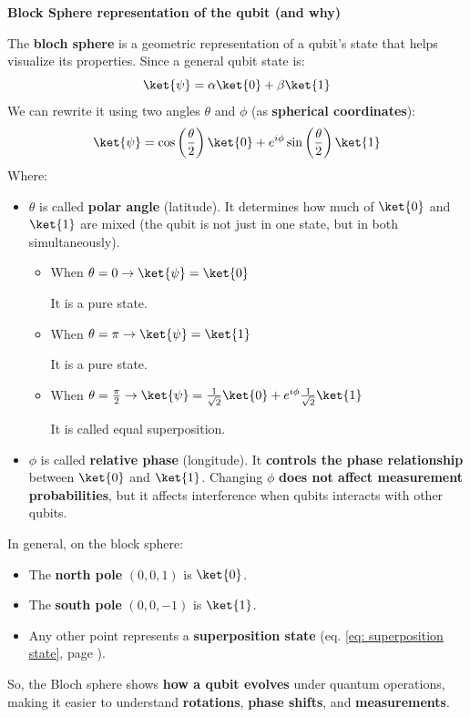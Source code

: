 \begin{flushleft}
    \textcolor{Green3}{ \textbf{Block Sphere representation of the qubit (and why)}}
\end{flushleft}
The \textbf{bloch sphere} is a geometric representation of a qubit's state that helps visualize its properties. Since a general qubit state is:
\begin{equation*}
    \ket{\psi} = \alpha\ket{0} + \beta\ket{1}
\end{equation*}
We can rewrite it using two angles $\theta$ and $\phi$ (as \textbf{spherical coordinates}):
\begin{equation}\label{eq: superposition state}
    \ket{\psi} = \cos\left(\dfrac{\theta}{2}\right) \ket{0} + e^{i\phi} \sin\left(\dfrac{\theta}{2}\right) \ket{1}
\end{equation}
Where:
\begin{itemize}
    \item $\theta$ is called \textbf{polar angle} (latitude). It determines how much of $\ket{0}$ and $\ket{1}$ are mixed (the qubit is not just in one state, but in both simultaneously).
    \begin{itemize}
        \item When $\theta = 0 \rightarrow \ket{\psi} = \ket{0}$

        It is a pure state.
        \item When $\theta = \pi \rightarrow \ket{\psi} = \ket{1}$

        It is a pure state.
        \item When $\theta = \frac{\pi}{2} \rightarrow \ket{\psi} = \frac{1}
        {\sqrt{2}}\ket{0} + e^{i\phi} \frac{1}{\sqrt{2}}\ket{1}$

        It is called equal superposition.
    \end{itemize}
    \item $\phi$ is called \textbf{relative phase} (longitude). It \textbf{controls the phase relationship} between $\ket{0}$ and $\ket{1}$. Changing $\phi$ \textbf{does not affect measurement probabilities}, but it affects interference when qubits interacts with other qubits.
\end{itemize}
In general, on the block sphere:
\begin{itemize}
    \item The \textbf{north pole} $\left(0,0,1\right)$ is $\ket{0}$.
    \item The \textbf{south pole} $\left(0,0,-1\right)$ is $\ket{1}$.
    \item Any other point represents a \textbf{superposition state} (eq. \ref{eq: superposition state}, page \pageref{eq: superposition state}).

\end{itemize}
So, the Bloch sphere shows \textbf{how a qubit evolves} under quantum operations, making it easier to understand \textbf{rotations}, \textbf{phase shifts}, and \textbf{measurements}.


